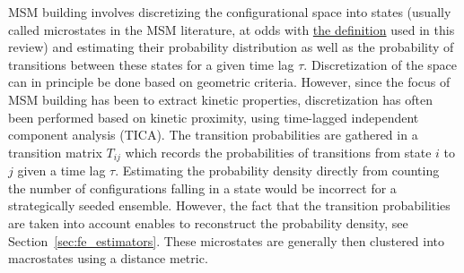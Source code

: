 \documentclass[9pt,review]{livecoms}
\begin{document}
MSM building involves discretizing the configurational space into states (usually called microstates in the MSM literature, at odds with \hyperlink{Microstate} {the definition} used in this review) and estimating their probability distribution as well as the probability of transitions between these states for a given time lag $\tau$. Discretization of the space can in principle be done based on geometric criteria. However, since the focus of MSM building has been to extract kinetic properties, discretization has often been performed based on kinetic proximity, using time-lagged independent component analysis (TICA). The transition probabilities are gathered in a transition matrix $T_{ij}$ which records the probabilities of transitions from state $i$ to $j$ given a time lag $\tau$. Estimating the probability density directly from counting the number of configurations falling in a state would be incorrect for a strategically seeded ensemble. However, the fact that the transition probabilities are taken into account enables to reconstruct the probability density, see Section~\ref{sec:fe_estimators}. These microstates are generally then clustered into macrostates using a distance metric.
\end{document}
